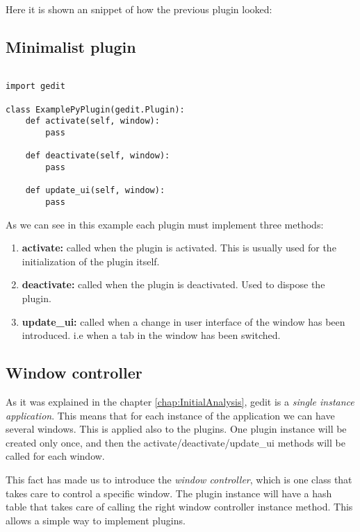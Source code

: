 Here it is shown an snippet of how the previous plugin looked:

\subsection{Minimalist plugin}

\begin{lstlisting}[style=python]

import gedit

class ExamplePyPlugin(gedit.Plugin):
    def activate(self, window):
        pass

    def deactivate(self, window):
        pass

    def update_ui(self, window):
        pass

\end{lstlisting}

As we can see in this example each plugin must implement three methods:
\begin{enumerate}
  \item \textbf{activate:} called when the plugin is activated. This is usually used for the initialization of the plugin itself.
  \item \textbf{deactivate:} called when the plugin is deactivated. Used to dispose the plugin.
  \item \textbf{update\_ui:} called when a change in user interface of the window has been introduced. i.e when a tab in the window has been switched.
\end{enumerate}

\subsection{Window controller}\label{sec:WindowController}

As it was explained in the chapter \ref{chap:InitialAnalysis}, gedit is a \emph{single instance application}. This means that for each instance of the application we can have several windows. This is applied also to the plugins. One plugin instance will be created only once, and then the activate/deactivate/update\_ui methods will be called for each window.

This fact has made us to introduce the \emph{window controller}, which is one class that takes care to control a specific window. The plugin instance will have a hash table that takes care of calling the right window controller instance method. This allows a simple way to implement plugins.

